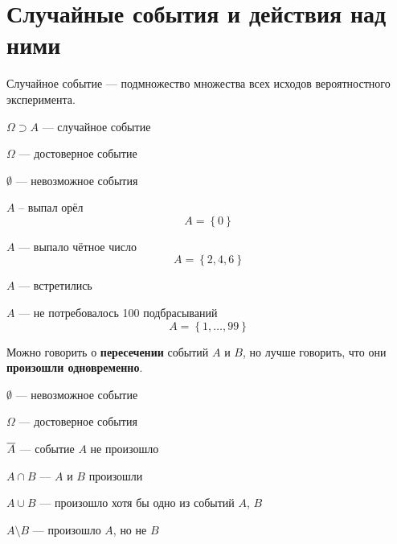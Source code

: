 \section{Случайные события и действия над ними}
\begin{definition}
Случайное событие --- подмножество множества всех исходов
вероятностного эксперимента.
\end{definition}
$\Omega \supset A$ --- случайное событие

$\Omega$ --- достоверное событие

$\emptyset$ --- невозможное события

\begin{example}
$A$ -- выпал орёл
$$A=\left\{0\right\}$$
\end{example}
\begin{example}
$A$ --- выпало чётное число
$$A = \left\{ 2,4,6 \right\}$$
\end{example}
\begin{example}
$A$ --- встретились
\end{example}
\begin{example}
$A$ --- не потребовалось 100 подбрасываний
$$A = \left\{ 1, \dots ,99 \right\}$$
\end{example}

Можно говорить о \textbf{пересечении} событий $A$ и $B$,
но лучше говорить, что они \textbf{произошли одновременно}.

$\emptyset$ --- невозможное событие

$\Omega$ --- достоверное события

$\overline{A}$ --- событие $A$ не произошло

$A\cap B$ --- $A$ и $B$ произошли

$A\cup B$ --- произошло хотя бы одно из событий $A$, $B$

$A\setminus B$ --- произошло $A$, но не $B$

